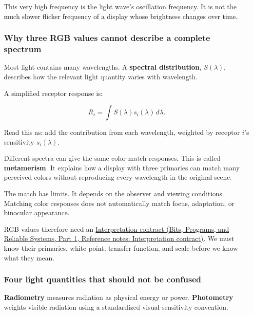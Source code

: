 This very high frequency is the light wave's oscillation frequency. It is not the much slower flicker frequency of a display whose brightness changes over time.

\subsubsection{Why three RGB values cannot describe a complete spectrum}\label{04-visual-computing-ii-ch042-why-three-rgb-values-cannot-describe-a-complete-spectrum}

\hypertarget{04-visual-computing-ii-ch042-why-three-rgb-values-cannot-describe-a-complete-spectrum}{}

Most light contains many wavelengths. A \textbf{spectral distribution}, \(S(\lambda)\), describes how the relevant light quantity varies with wavelength.

A simplified receptor response is:

\[
R_i=\int S(\lambda)s_i(\lambda)\,d\lambda.
\]

Read this as: add the contribution from each wavelength, weighted by receptor \(i\)'s sensitivity \(s_i(\lambda)\).

Different spectra can give the same color-match responses. This is called \textbf{metamerism}. It explains how a display with three primaries can match many perceived colors without reproducing every wavelength in the original scene.

The match has limits. It depends on the observer and viewing conditions. Matching color responses does not automatically match focus, adaptation, or binocular appearance.

RGB values therefore need an \href{../01-Bits-Programs-and-Reliable-Systems-P01/main.pdf\#nameddest=appendix-f414bd4ed05c}{Interpretation contract (Bits, Programs, and Reliable Systems, Part 1, Reference notes: Interpretation contract)}. We must know their primaries, white point, transfer function, and scale before we know what they mean.

\subsubsection{Four light quantities that should not be confused}\label{04-visual-computing-ii-ch042-four-light-quantities-that-should-not-be-confused}

\hypertarget{04-visual-computing-ii-ch042-four-light-quantities-that-should-not-be-confused}{}

\textbf{Radiometry} measures radiation as physical energy or power. \textbf{Photometry} weights visible radiation using a standardized visual-sensitivity convention.

